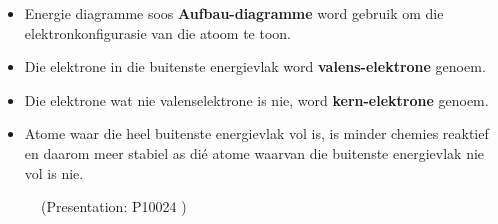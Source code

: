\begin{itemize}[noitemsep]
\item Energie diagramme soos \textbf{Aufbau-diagramme} word gebruik om die elektronkonfigurasie van die atoom te toon.
\item Die elektrone in die buitenste energievlak word \textbf{valens-elektrone} genoem.
\item Die elektrone wat nie valenselektrone is nie, word \textbf{kern-elektrone} genoem.
\item Atome waar die heel buitenste energievlak vol is, is minder chemies reaktief en daarom meer stabiel as dié atome waarvan die buitenste energievlak nie vol is nie.
\end{itemize}

    \setcounter{subfigure}{0}
	\begin{figure}[H] %
    \label{m38741*slideshareflash2}
             { (Presentation:  P10024 )}
 \end{figure}       \par 
            

